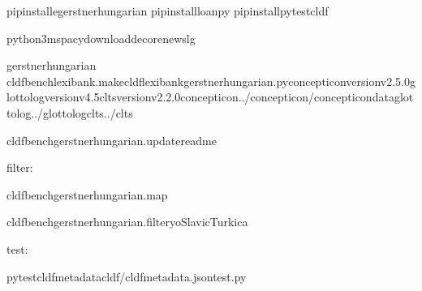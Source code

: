 \documentclass[letterpaper,10pt,english]{sphinxmanual}
\begin{document}
{{{{\begin{sphinxVerbatim}[commandchars=\\\{\}]
pipinstall\PYGZhy{}egerstnerhungarian
pipinstallloanpy
pipinstallpytest\PYGZhy{}cldf

python3\PYGZhy{}mspacydownloadde\PYGZus{}core\PYGZus{}news\PYGZus{}lg

gerstnerhungarian
cldfbenchlexibank.makecldflexibank\PYGZus{}gerstnerhungarian.py\PYGZhy{}\PYGZhy{}concepticon\PYGZhy{}versionv2.5.0\PYGZhy{}\PYGZhy{}glottolog\PYGZhy{}versionv4.5\PYGZhy{}\PYGZhy{}clts\PYGZhy{}versionv2.2.0\PYGZhy{}\PYGZhy{}concepticon../concepticon/concepticon\PYGZhy{}data\PYGZhy{}\PYGZhy{}glottolog../glottolog\PYGZhy{}\PYGZhy{}clts../clts

cldfbenchgerstnerhungarian.update\PYGZus{}readme
\end{sphinxVerbatim}

\sphinxAtStartPar
filter:

\begin{sphinxVerbatim}[commandchars=\\\{\}]
cldfbenchgerstnerhungarian.map

cldfbenchgerstnerhungarian.filter\PYGZhy{}y\PYGZhy{}oSlavicTurkic\PYGZhy{}a
\end{sphinxVerbatim}

\sphinxAtStartPar
test:

\begin{sphinxVerbatim}[commandchars=\\\{\}]
pytest\PYGZhy{}\PYGZhy{}cldf\PYGZhy{}metadatacldf/cldf\PYGZhy{}metadata.jsontest.py
\end{sphinxVerbatim}

\sphinxstepscope


}}}}
\end{document}
